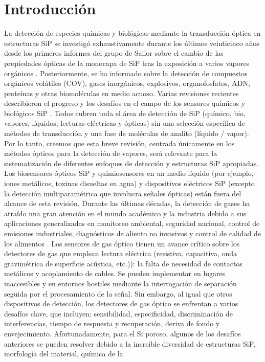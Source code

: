 \documentclass[a4paper,11pt,]{book}
\begin{document}
\section{Introducción}
La detección de especies químicas y biológicas mediante la transducción óptica en estructuras SiP se investigó exhaustivamente durante los últimos veinticinco años desde los primeros informes del grupo de Sailor sobre el cambio de las propiedades ópticas de la monocapa de SiP tras la exposición a varios vapores orgánicos \cite{ssn1, ssn2}. Posteriormente, se ha informado sobre la detección de compuestos orgánicos volátiles (COV), gases inorgánicos, explosivos, organofosfatos, ADN, proteínas y otras biomoléculas en medio acuoso. Varias revisiones recientes describieron el progreso y los desafíos en el campo de los sensores químicos y biológicos SiP \cite{ssn3, ssn4, ssn5}. Todos cubren toda el área de detección de SiP (químico, bio, vapores, líquidos, lecturas eléctricas y ópticas) sin una selección específica de métodos de transducción y una fase de moléculas de analito (líquido / vapor). Por lo tanto, creemos que esta breve revisión, centrada únicamente en los métodos ópticos para la detección de vapores, será
relevante para la sistematización de diferentes enfoques de detección y estructuras SiP apropiadas. Los biosensores ópticos SiP y quimiosensores en un medio líquido (por ejemplo, iones metálicos, toxinas disueltas en agua) y dispositivos eléctricos SiP (excepto la detección multiparamétrica que involucra señales ópticas) están fuera del alcance de esta revisión. Durante las últimas décadas, la detección de gases ha atraído una gran atención en el mundo académico y la industria debido a sus aplicaciones generalizadas en monitoreo ambiental, seguridad nacional,
control de emisiones industriales, diagnósticos de aliento no invasivos y control de calidad de los alimentos \cite{ssn6}. Los sensores de gas óptico tienen un avance crítico sobre los detectores de gas que emplean lectura eléctrica (resistiva, capacitiva, onda gravimétrica de superficie acústica, etc.)): la falta de necesidad de contactos metálicos y acoplamiento de cables. Se pueden implementar en lugares
inaccesibles y en entornos hostiles mediante la interrogación de separación seguida por el procesamiento de la señal. Sin embargo, al igual que otros dispositivos de detección, los detectores de gas óptico se enfrentan a varios desafíos clave, que incluyen: sensibilidad, especificidad,
discriminación de interferencias, tiempo de respuesta y recuperación, deriva de fondo y envejecimiento. Afortunadamente, para el Si poroso, algunos de los desafíos anteriores se pueden resolver debido a la increíble diversidad de estructuras SiP, morfología del material, química de la
\end{document}
